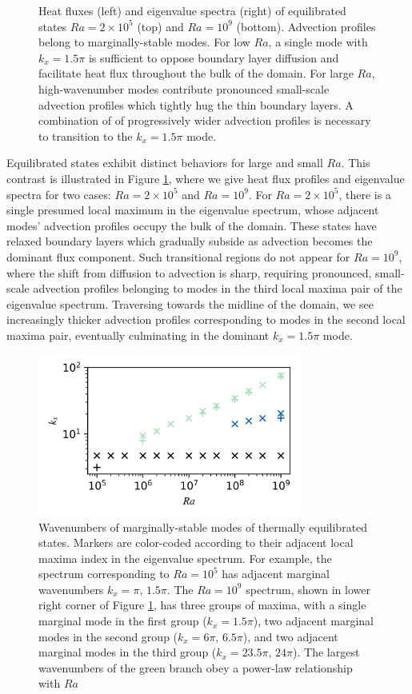 \documentclass[reprint,amsmath,amssymb,aps]{revtex4-1}
\begin{document}
\begin{figure}
\begin{tabular}{@{}c@{}}
    \end{tabular}
    \caption{Heat fluxes (left) and eigenvalue spectra (right) of equilibrated states $Ra = 2 \times 10^5$ (top) and $Ra = 10^9$ (bottom). 
    Advection profiles belong to marginally-stable modes. 
    For low $Ra$, a single mode with $k_x = 1.5\pi$ is sufficient to oppose boundary layer diffusion and facilitate heat flux throughout the bulk of the domain. 
    For large $Ra$, high-wavenumber modes contribute pronounced small-scale advection profiles which tightly hug the thin boundary layers. 
    A combination of of progressively wider advection profiles is necessary to transition to the $k_x = 1.5\pi$ mode.}
    \label{fig:flux}
\end{figure}

Equilibrated states exhibit distinct behaviors for large and small $Ra$. 
This contrast is illustrated in Figure \ref{fig:flux}, where we give heat flux profiles and eigenvalue spectra for two cases: $Ra = 2 \times 10^5$ and $Ra = 10^9$. 
For $Ra = 2 \times 10^5$, there is a single presumed local maximum in the eigenvalue spectrum, whose adjacent modes' advection profiles occupy the bulk of the domain. 
These states have relaxed boundary layers which gradually subside as advection becomes the dominant flux component. 
Such transitional regions do not appear for $Ra = 10^9$, where the shift from diffusion to advection is sharp, requiring pronounced, small-scale advection profiles belonging to modes in the third local maxima pair of the eigenvalue spectrum. 
Traversing towards the midline of the domain, we see increasingly thicker advection profiles corresponding to modes in the second local maxima pair, eventually culminating in the dominant $k_x = 1.5\pi$ mode.

\begin{figure}
    \centering
    \includegraphics[width=3.4in]{kx_m_ra1.png}
    \caption{Wavenumbers of marginally-stable modes of thermally equilibrated states. 
    Markers are color-coded according to their adjacent local maxima index in the eigenvalue spectrum. 
    For example, the spectrum corresponding to $Ra = 10^5$ has adjacent marginal wavenumbers $k_x = \pi, \, 1.5\pi$. 
    The $Ra = 10^9$ spectrum, shown in lower right corner of Figure \ref{fig:flux}, has three groups of maxima, with a single marginal mode in the first group ($k_x = 1.5\pi$), two adjacent marginal modes in the second group ($k_x = 6\pi, \, 6.5\pi$), and two adjacent marginal modes in the third group ($k_x = 23.5\pi, \, 24\pi$). 
    The largest wavenumbers of the green branch obey a power-law relationship with $Ra$}
    \label{fig:kx_marginals}
\end{figure}
\end{document}
